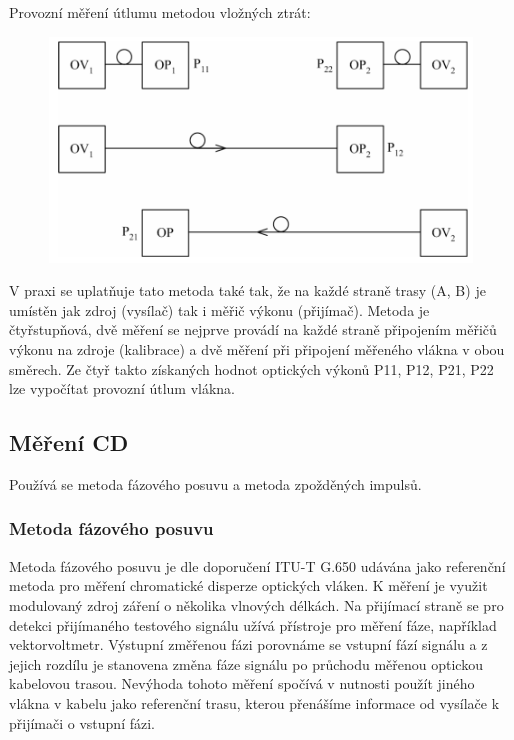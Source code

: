 Provozní měření útlumu metodou vložných ztrát:
\begin{figure}[!ht]
\begin{center}
    \includegraphics[scale=1]{obrazky/vlozutl.png}
  \end{center}
\end{figure}

V praxi se uplatňuje tato metoda také tak, že na každé straně trasy (A, B) je umístěn jak zdroj (vysílač) tak i měřič výkonu (přijímač). Metoda je čtyřstupňová, dvě měření se nejprve provádí na každé straně připojením měřičů výkonu na zdroje (kalibrace) a dvě měření při připojení měřeného vlákna v obou směrech. Ze čtyř takto získaných hodnot optických výkonů P11, P12, P21, P22 lze vypočítat provozní útlum vlákna.

\subsection{Měření CD}
Používá se metoda fázového posuvu a metoda zpožděných impulsů.

\subsubsection{Metoda fázového posuvu}
Metoda fázového posuvu je dle doporučení ITU-T G.650 udávána jako referenční metoda pro měření chromatické disperze optických vláken. K měření je využit modulovaný zdroj záření o několika vlnových délkách. Na přijímací straně se pro detekci přijímaného testového signálu užívá přístroje pro měření fáze, například vektorvoltmetr. Výstupní změřenou fázi porovnáme se vstupní fází signálu a z jejich rozdílu je stanovena změna fáze signálu po průchodu měřenou optickou kabelovou trasou. Nevýhoda tohoto měření spočívá v nutnosti použít jiného vlákna v kabelu jako referenční trasu, kterou přenášíme informace od vysílače k přijímači o vstupní fázi. 

